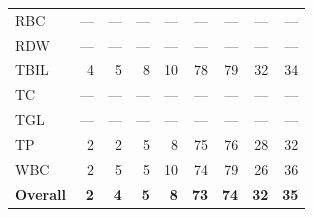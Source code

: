 \begin{table}[ht]
\begin{tabular}{lrrrrrrrr}
RBC & --- & --- & --- & --- & --- & --- & --- & --- \\
RDW & --- & --- & --- & --- & --- & --- & --- & --- \\
TBIL & 4 & 5 & 8 & 10 & 78 & 79 & 32 & 34 \\
TC & --- & --- & --- & --- & --- & --- & --- & --- \\
TGL & --- & --- & --- & --- & --- & --- & --- & --- \\
TP & 2 & 2 & 5 & 8 & 75 & 76 & 28 & 32 \\
WBC & 2 & 5 & 5 & 10 & 74 & 79 & 26 & 36 \\
\midrule
\textbf{Overall} & \textbf{2} & \textbf{4} & \textbf{5} & \textbf{8} & \textbf{73} & \textbf{74} & \textbf{32} & \textbf{35} \\
\bottomrule
\end{tabular}
\label{tab:12_eval_interpretable_inspire}
\end{table}